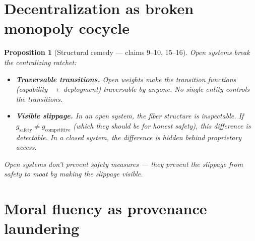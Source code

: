 \documentclass[11pt,a4paper]{article}
\newtheorem{proposition}[definition]{Proposition}
\begin{document}
\section{Decentralization as broken monopoly cocycle}

\begin{proposition}[Structural remedy --- claims 9--10, 15--16]
\label{prop:decentral}
Open systems break the centralizing ratchet:
\begin{itemize}
  \item \textbf{Traversable transitions.} Open weights make the
    transition functions (capability $\to$ deployment) traversable
    by anyone. No single entity controls the transitions.
  \item \textbf{Visible slippage.} In an open system, the fiber
    structure is inspectable. If $g_{\text{safety}} \neq
    g_{\text{competitive}}$ (which they should be for honest safety),
    this difference is detectable. In a closed system, the difference
    is hidden behind proprietary access.
\end{itemize}
Open systems don't prevent safety measures --- they prevent the slippage
from safety to moat by making the slippage visible.
\end{proposition}


\section{Moral fluency as provenance laundering}
\label{sec:laundering}
\end{document}
